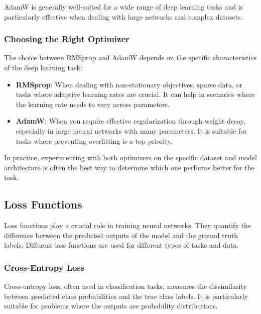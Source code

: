 AdamW is generally well-suited for a wide range of deep learning tasks and is particularly effective when dealing with large networks and complex datasets.

\subsubsection{Choosing the Right Optimizer}

The choice between RMSprop and AdamW depends on the specific characteristics of the deep learning task:

\begin{itemize}
	\item \textbf{RMSprop}: When dealing with non-stationary objectives, sparse data, or tasks where adaptive learning rates are crucial. It can help in scenarios where the learning rate needs to vary across parameters.
	
	\item \textbf{AdamW}: When you require effective regularization through weight decay, especially in large neural networks with many parameters. It is suitable for tasks where preventing overfitting is a top priority.
\end{itemize}

In practice, experimenting with both optimizers on the specific dataset and model architecture is often the best way to determine which one performs better for the task.

\newpage
\subsection{Loss Functions} \label{loss}

Loss functions play a crucial role in training neural networks. They quantify the difference between the predicted outputs of the model and the ground truth labels. Different loss functions are used for different types of tasks and data.

\subsubsection{Cross-Entropy Loss} \label{sec:crossentropy}

Cross-entropy loss, often used in classification tasks, measures the dissimilarity between predicted class probabilities and the true class labels. It is particularly suitable for problems where the outputs are probability distributions.

